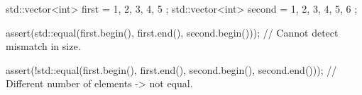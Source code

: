 \begin{box-note}
\begin{cppcode}
std::vector<int> first = { 1, 2, 3, 4, 5 };
std::vector<int> second = { 1, 2, 3, 4, 5, 6 };

assert(std::equal(first.begin(), first.end(), 
                  second.begin()));
// Cannot detect mismatch in size.

assert(!std::equal(first.begin(), first.end(), 
                   second.begin(), second.end()));
// Different number of elements -> not equal.
\end{cppcode}
\end{box-note}